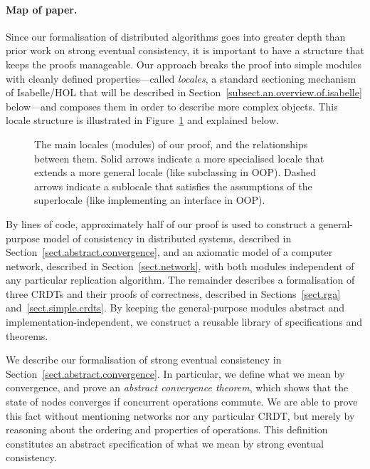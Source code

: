 \paragraph{Map of paper.}
\label{sect.high-level.proof.strategy}

Since our formalisation of distributed algorithms goes into greater depth than prior work on strong eventual consistency, it is important to have a structure that keeps the proofs manageable.
Our approach breaks the proof into simple modules with cleanly defined properties---called \emph{locales}, a standard sectioning mechanism of Isabelle/HOL that will be described in Section~\ref{subsect.an.overview.of.isabelle} below---and composes them in order to describe more complex objects.
This locale structure is illustrated in Figure~\ref{fig.proof.structure} and explained below.

\begin{figure}
\centering

\caption{The main locales (modules) of our proof, and the relationships between them.
Solid arrows indicate a more specialised locale that extends a more general locale (like subclassing in OOP).
Dashed arrows indicate a sublocale that satisfies the assumptions of the superlocale (like implementing an interface in OOP).
}\label{fig.proof.structure}
\end{figure}

By lines of code, approximately half of our proof is used to construct a general-purpose model of consistency in distributed systems, described in Section~\ref{sect.abstract.convergence}, and an axiomatic model of a computer network, described in Section~\ref{sect.network}, with both modules independent of any particular replication algorithm.
The remainder describes a formalisation of three CRDTs and their proofs of correctness, described in Sections~\ref{sect.rga} and~\ref{sect.simple.crdts}.
By keeping the general-purpose modules abstract and implementation-independent, we construct a reusable library of specifications and theorems.

We describe our formalisation of strong eventual consistency in Section~\ref{sect.abstract.convergence}.
In particular, we define what we mean by convergence, and prove an \emph{abstract convergence theorem}, which shows that the state of nodes converges if concurrent operations commute.
We are able to prove this fact without mentioning networks nor any particular CRDT, but merely by reasoning about the ordering and properties of operations.
This definition constitutes an abstract specification of what we mean by strong eventual consistency.

